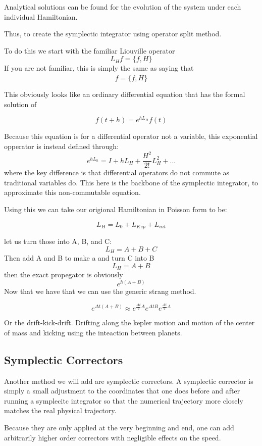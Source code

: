 Analytical solutions can be found for the evolution of the system under each individual Hamiltonian.


Thus, to create the symplectic integrator using operator split method.

To do this we start with the familiar Liouville operator
\[
	L_H f = \{f, H\}
\]
If you are not familiar, this is simply the same as saying that
\[
	\dot{f} = \{f,H \}
\]

This obviously looks like an ordinary differential equation that has the formal solution of

\[
	f(t+h) = e^{h L_H}f(t)
\]

Because this equation is for a differential operator not a variable, this exponential opperator is instead defined through:
\[
	e^{hL_h} = I + hL_H + \frac{H^2}{2!}L^2_H + ...
\]
where the key difference is that differential operators do not commute as traditional variables do. This here is the backbone of the symplectic integrator, to approximate this non-commutable equation.

Using this we can take our origional Hamiltonian in Poisson form to be:

\[
	L_H = L_0 + L_{Kep} + L_{int}
\]

let us turn those into A, B, and C:
\[
	L_H = A + B + C
\]
Then add A and B to make a and turn C into B
\[
	L_H = A + B
\]
then the exact propegator is obviously
\[
	e^{h(A+B)}
\]
Now that we have that we can use the generic strang method.

\[
	\boxed{
		e^{\Delta t(A+B)}
		\approx
		e^{\frac{\Delta t}{2}A}
		e^{\Delta t B}
		e^{\frac{\Delta t}{2}A}
	}
\]

Or the drift-kick-drift. Drifting along the kepler motion and motion of the center of mass and kicking using the inteaction between planets.

\subsection{Symplectic Correctors}

Another method we will add are symplectic correctors. A symplectic corrector is simply a small adjustment to the coordinates that one does before and after running a symplecitc integrator so that the numerical trajectory more closely matches the real physical trajectory.

Because they are only applied at the very beginning and end, one can add arbitrarily higher order correctors with negligible effects on the speed.

